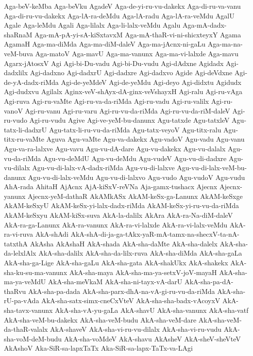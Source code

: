 {Aga-beV-keMba
Aga-beVku
AgadeV
Aga-de-yi-ru-vu-dakekx
Aga-di-ru-va-vanu
Aga-di-ru-vu-dakekx
Aga-lA-ra-deMdu
Aga-lA-radu
Aga-lA-ra-veMdu
AgalU
Agale
Aga-leMdu
Agali
Aga-lilalx
Aga-li-lalx-veMdu
Agalu
Aga-mA-dadx-shaRnaM
Aga-mA-pA-yi-sA-kiSxtavxM
Aga-mA-thaR-vi-ni-shicxteyxY
Agama
AgamaH
Aga-ma-diMda
Aga-ma-diM-daleV
Aga-ma-jAcnx-ni-gaLu
Aga-ma-na-veM-buva
Aga-matoV
Aga-mavU
Aga-ma-vanunx
Aga-ma-vi-lalxde
Aga-mavu
Agarx-jAtosxV
Agi
Agi-bi-Du-vadu
Agi-bi-Du-vudu
Agi-dAdxne
Agidadx
Agi-dadxlilx
Agi-dadxno
Agi-dadxrU
Agi-dadxre
Agi-dadxvo
Agide
Agi-deVdxne
Agi-de-yA-dadx-riMda
Agi-de-yeMdeV
Agi-de-yeMdu
Agi-deyo
Agi-didxtu
Agidudx
Agi-dudxvu
Agilalx
Aginx-veV-shAyx-dA-ginx-veVshayxH
Agi-ralu
Agi-ru-vAga
Agi-ruva
Agi-ru-vaMte
Agi-ru-va-da-riMda
Agi-ru-vadu
Agi-ru-valilx
Agi-ru-vanoV
Agi-ru-vanu
Agi-ru-varu
Agi-ru-vu-da-riMda
Agi-ru-vu-da-riM-daleV
Agi-ru-vudo
Agi-ru-vudu
Agive
Agi-ve-yeM-bu-danunx
Agu-tatxde
Agu-tatxleV
Agu-tatx-li-dadxrU
Agu-tatx-li-ru-vu-da-riMda
Agu-tatx-veyoV
Agu-titx-ralu
Agu-titx-ru-vaMte
Aguva
Agu-vaMte
Agu-va-dakekx
Agu-vadoV
Agu-vadu
Agu-vanu
Agu-va-ra-lalxve
Agu-vavu
Agu-vu-dA-dare
Agu-vu-dakekx
Agu-vu-dalalx
Agu-vu-da-riMda
Agu-vu-deMdU
Agu-vu-deMdu
Agu-vudeV
Agu-vu-di-dadxre
Agu-vu-dilalx
Agu-vu-di-lalx-vA-dadx-riMda
Agu-vu-di-lalxve
Agu-vu-di-lalx-veM-bu-danunx
Agu-vu-di-lalx-veMdu
Agu-vu-di-lalxvo
Agu-vudo
Agu-vudoV
Agu-vudu
AhA-rada
AhitaH
AjAcnx
AjA-kiSxV-reVNa
Aja-gamx-tushacx
Ajecnx
Ajecnx-yanunx
Ajecnx-yeM-dathaR
AkAMkASx
AkAM-keSx-ga-Lanunx
AkAM-keSxge
AkAM-keSxyU
AkAM-keSx-yi-lalx-dadx-riMda
AkAM-keSx-yi-ru-vu-da-riMda
AkAM-keSxyu
AkAM-kiSx-suva
AkA-la-dalilx
AkAra
AkA-ra-Na-diM-daleV
AkA-ra-ga-Lanunx
AkA-ra-vanunx
AkA-ra-vi-lalxde
AkA-ra-vi-lalx-veMdu
AkA-ra-vi-ruva
AkA-shAdi
AkA-shA-di-ja-ga-tAkx-yaR-mA-tamx-na-shecxV-ta-nA-tatxthA
AkAsha
AkAshaH
AkA-shada
AkA-sha-daMte
AkA-sha-dalelx
AkA-sha-da-lelxlAlx
AkA-sha-dalilx
AkA-sha-da-lilx-ruva
AkA-sha-diMda
AkA-sha-gaLa
AkA-sha-ga-Lige
AkA-sha-gaLu
AkA-sha-gata
AkA-shakUkx
AkA-shakekx
AkA-sha-ku-su-ma-vanunx
AkA-sha-maya
AkA-sha-ma-ya-setxV-joV-mayaH
AkA-sha-ma-ya-veMdU
AkA-sha-meVkaM
AkA-sha-ni-tayx-vA-darU
AkA-sha-pa-dA-thaRvu
AkA-sha-pa-dada
AkA-sha-parx-dhA-na-vA-gi-ru-vu-da-riMda
AkA-sha-rU-pa-vAda
AkA-sha-satx-simx-cneCxVteV
AkA-sha-sha-badx-vAcoyxV
AkA-sha-tavx-vanunx
AkA-sha-vA-yu-gaLa
AkA-shavU
AkA-sha-vanunx
AkA-sha-vatf
AkA-sha-veM-bu-dakekx
AkA-sha-veM-budu
AkA-sha-veM-dare
AkA-sha-veM-da-thaR-valalx
AkA-shaveV
AkA-sha-vi-ru-vu-dilalx
AkA-sha-vi-ru-vudu
AkA-sha-voM-deM-budu
AkA-sha-voMdeV
AkA-shavu
AkAsheV
AkA-sheV-sheVteV
AkAshoV
Aka-SiR-sa-lapxTaTx
Aka-SiR-sa-lapx-TaTx-va-LAgi
}
